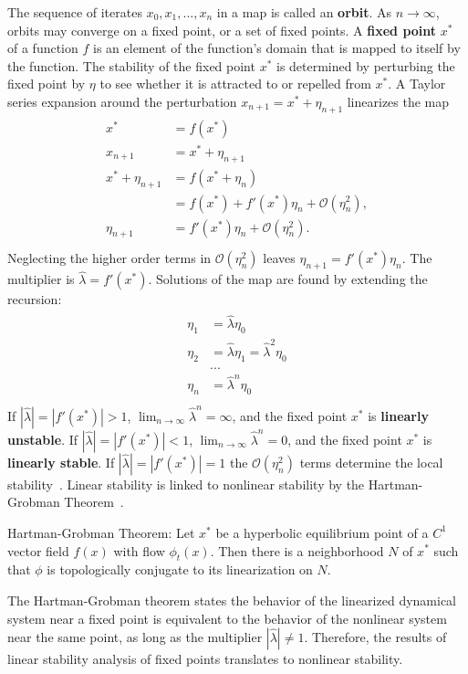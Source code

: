 The sequence of iterates ${x_0,x_1,...,x_n}$ in a map is
called an \textbf{orbit}. As $n \to \infty$, orbits may converge on a fixed point, or a
set of fixed points. A \textbf{fixed point} $x^*$ of a function $f$ is an element of the
function's domain that is mapped to itself by the function. The stability of the fixed point $x^*$ is
determined by perturbing the fixed point by $\eta$ to see whether it is
attracted to or repelled from $x^*$. A Taylor series expansion around
the perturbation $x_{n+1} = x^* + \eta_{n+1}$ linearizes the map
\begin{align*}
\begin{split}
x^* &= f(x^*)\\
x_{n+1} &= x^* + \eta_{n+1}\\
x^* + \eta_{n+1} &= f(x^* + \eta_n)\\
&= f(x^*) + f'(x^*)\eta_n + \mathcal{O}(\eta_n^2),\\
\eta_{n+1} &= f'(x^*)\eta_n + \mathcal{O}(\eta_n^2).\\
\end{split}
\end{align*}
Neglecting the higher order terms in $\mathcal{O}(\eta_n^2)$ leaves
$\eta_{n+1} = f'(x^*)\eta_n$. The multiplier is $\hat{\lambda} =
f'(x^*)$. Solutions of the map are found by extending the recursion:
\begin{align*}
\begin{split}
\eta_{1} &= \hat{\lambda}\eta_0\\
\eta_{2} &= \hat{\lambda}\eta_1 = \hat{\lambda}^2\eta_0\\
&...\\
\eta_{n} &=\hat{\lambda}^n\eta_0\\
\end{split}
\end{align*}
If $|\hat{\lambda}| = |f'(x^*)| > 1$, $\lim_{n \to \infty}\hat{\lambda}^n = \infty$, and
the fixed point $x^*$ is \textbf{linearly unstable}. If $|\hat{\lambda}| = |f'(x^*)| < 1$, $\lim_{n \to
  \infty}\hat{\lambda}^n = 0$, and the fixed point $x^*$ is
\textbf{linearly stable}. If
$|\hat{\lambda}| = |f'(x^*)| = 1$ the $\mathcal{O}(\eta_n^2)$ terms
determine the local stability~\cite{strogatz}. Linear stability is
linked to nonlinear stability by the Hartman-Grobman Theorem~\cite{meiss}.
\begin{singlespace}
\begin{theorem}
Hartman-Grobman Theorem: Let $x^*$ be a hyperbolic equilibrium point of a $C^1$
vector field $f(x)$ with flow $\phi_t(x)$. Then there is a
neighborhood $N$ of $x^*$ such that $\phi$ is topologically conjugate to its linearization on $N$.
\end{theorem}
\end{singlespace}
The Hartman-Grobman theorem states the behavior of the linearized
dynamical system near a fixed point is equivalent to the
behavior of the nonlinear system near the same point, as long as the
multiplier $|\hat{\lambda}|\neq 1$. Therefore, the results of linear stability
analysis of fixed points translates to nonlinear stability. 

